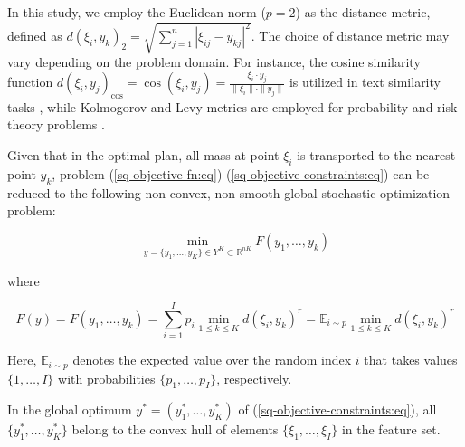 In this study, we employ the Euclidean norm ($p = 2$) as the distance metric, defined as $d(\xi_i, y_k)_2 = \sqrt{\sum_{j=1}^n | \xi_{ij} - y_{kj} |^2}$. The choice of distance metric may vary depending on the problem domain. For instance, the cosine similarity function $d(\xi_i, y_j)_{\text{cos}} = \cos(\xi_i, y_j) = \frac{\xi_i \cdot y_j}{\| \xi_i \| \cdot \| y_j \|}$ is utilized in text similarity tasks \cite{Babic_2020,vor_der_bruck_pouly_2019}, while Kolmogorov and Levy metrics are employed for probability and risk theory problems \cite{Kuzmenko_Uryasev_2019}.

Given that in the optimal plan, all mass at point $\xi_i$ is transported to the nearest point $y_k$, problem (\ref{sq-objective-fn:eq})-(\ref{sq-objective-constraints:eq}) can be reduced to the following non-convex, non-smooth global stochastic optimization problem:

\begin{equation}
    \label{global-sq-objective-fn:eq}
    \min_{y = \{ y_1, \ldots, y_K \} \in Y^K \subset \mathbb{R}^{nK}} F(y_1, \ldots, y_k)
\end{equation}

\noindent where

\begin{equation}
    \label{global-sq-fn-expansion:eq}
    F(y) = F(y_1, \ldots, y_k) = \sum_{i=1}^I p_i \min_{1 \leq k \leq K} d(\xi_i, y_k)^r = \mathbb{E}_{i \sim p} \min_{1 \leq k \leq K} d(\xi_i, y_k)^r
\end{equation}

Here, $\mathbb{E}_{i \sim p}$ denotes the expected value over the random index $i$ that takes values $\{1, \ldots, I\}$ with probabilities $\{p_1, \ldots, p_I\}$, respectively.

\begin{lemma}
    \label{Lemma 1}
    In the global optimum $y^{*} = (y_1^{*}, \ldots, y_K^{*})$ of (\ref{sq-objective-constraints:eq}), all $\{y_1^{*}, \ldots, y_K^{*}\}$ belong to the convex hull of elements $\{\xi_1, \ldots, \xi_I\}$ in the feature set.
\end{lemma}

